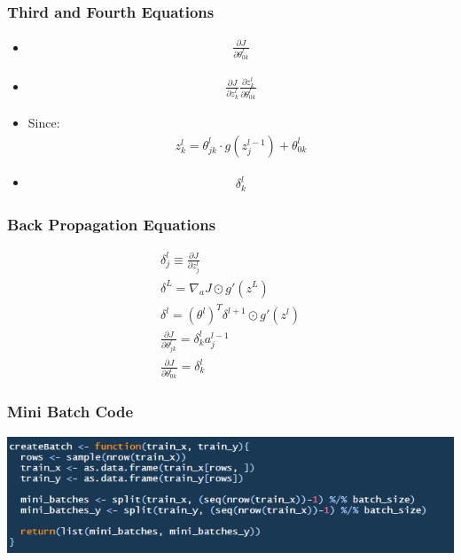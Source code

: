 \documentclass{beamer}
\begin{document}
\begin{frame}
    \frametitle{Third and Fourth Equations}

    \begin{itemize}[<+->]
        \item 
        \begin{gather*}
            \frac{\partial J}{\partial \theta_{0k}^{l}}
        \end{gather*}
        \item 
        \begin{gather*}
            \frac{\partial J}{\partial z_k^{l}}\frac{\partial z_k^{l}}{\partial \theta_{0k}^{l}}
        \end{gather*}
        \item Since:
        \begin{gather*}
            z_k^{l} = \theta_{jk}^{l}\cdot g(z_j^{l-1}) + \theta_{0k}^{l}
        \end{gather*}
        \item 
        \begin{gather*}
            \delta_k^l
        \end{gather*}
        
    \end{itemize}
    
\end{frame}

\begin{frame}
    \frametitle{Back Propagation Equations}

    \begin{gather*}
        \delta^l_j \equiv \frac{\partial J}{\partial z^{l}_j}\\
        \delta^L = \nabla_a J \odot g'(z^L)\\
        \delta^{l} = (\theta^{{l}})^T\delta^{l+1} \odot g'(z^{l})\\
        \frac{\partial J }{\partial \theta^l_{jk}} = \delta_k^l a^{l-1}_j \\
        \frac{\partial J }{\partial \theta^l_{0k}} = \delta^l_k
    \end{gather*}

\end{frame}

\begin{frame}
    \frametitle{Mini Batch Code}

    \centerline{\includegraphics[scale = .6]{createbatch.png}}

\end{frame}
\end{document}
